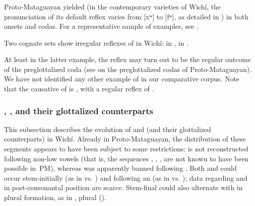 \subsubsection{}\label{wi-f}

Proto-Mataguayan  yielded  (in the contemporary varieties of Wichí, the pronunciation of its default reflex varies from [xʷ] to [fʷ], as detailed in ) in both onsets and codas. For a representative sample of examples, see .

Two cognate sets show irregular reflexes of  in Wichí:  in ,  in .

\begin{exe}
    \ex \flyv\label{fw:flyv}
    \ex \suckb\label{fp:suckle}
\end{exe}

At least in the latter example, the reflex  may turn out to be the regular outcome of the preglottalized coda  (see  on the preglottalized codas of Proto-Mataguayan). We have not identified any other example of  in our comparative corpus. Note that the causative of  is , with a regular reflex of .

\subsubsection{, , and their glottalized counterparts}\label{wi-q-k}

This subsection describes the evolution of  and  (and their glottalized counterparts) in Wichí. Already in Proto-Mataguayan, the distribution of these segments appears to have been subject to some restrictions:  is not reconstructed following non-low vowels (that is, the sequences , , ,  are not known to have been possible in~PM), whereas  was apparently banned following . Both  and  could occur stem-initially (as in  vs. ) and following an  (as in  vs. ); data regarding  and  in post-consonantal position are scarce. Stem-final  could also alternate with  in plural formation, as in , plural  ().


